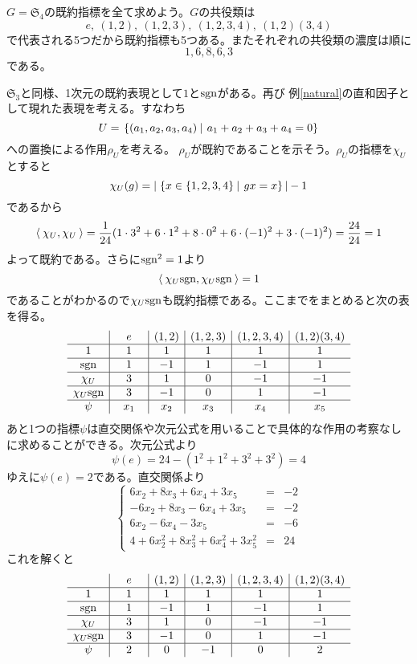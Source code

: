 \documentclass{ltjsarticle}
\begin{document}
\begin{eg}
  $G=\mathfrak{S}_4$の既約指標を全て求めよう。$G$の共役類は
  \[
  e,\:(1,2),\:(1,2,3),\:(1,2,3,4),\:(1,2)(3,4)  
  \]
  で代表される5つだから既約指標も5つある。またそれぞれの共役類の濃度は順に
  \[
  1,6,8,6,3  
  \]
  である。
  
  $\mathfrak{S}_3$と同様、1次元の既約表現として$1$と$\mathrm{sgn}$がある。再び
  例\ref{natural}の直和因子として現れた表現を考える。すなわち
  \[
  U=\left.\left\{(a_1,a_2,a_3,a_4) \: \right| \: a_1+a_2+a_3+a_4=0\right\}  
  \]
  への置換による作用$\rho_U$を考える。
  $\rho_U$が既約であることを示そう。$\rho_U$の指標を$\chi_U$とすると
  \[
  \chi_U(g)=|\left.\left\{x\in\{1,2,3,4\} \: \right| \: gx=x\right\}|-1  
  \]
  であるから
  \[
  \langle\:\chi_U,\chi_U\:\rangle=\frac{1}{24}(1\cdot 3^2+6\cdot 1^2+8\cdot 0^2+6\cdot (-1)^2+3\cdot(-1)^2)=\frac{24}{24}=1 
  \]
  よって既約である。さらに$\mathrm{sgn}^2=1$より
  \[
  \langle\:\chi_U\mathrm{sgn},\chi_U\mathrm{sgn}\:\rangle=1 
  \]
  であることがわかるので$\chi_U\mathrm{sgn}$も既約指標である。ここまでをまとめると次の表を得る。
  \[
    \begin{array}{c|c|c|c|c|c}
  
           & \quad e\quad & (1,2) & (1,2,3) & (1,2,3,4) & (1,2)(3,4)\\
      \hline
      1    & 1 &   1   &    1    &     1     &      1    \\
      \hline
      \mathrm{sgn} & 1 &   -1  &    1    &     -1    &      1   \\
      \hline
      \chi_U & 3 &   1   &    0    &     -1    &      -1  \\
      \hline
      \chi_U\mathrm{sgn} & 3 & -1 &   0    &     1    &     -1  \\
      \hline
      \psi       &  x_1  & x_2 & x_3 &   x_4    &     x_5     
    \end{array}
  \]
  あと1つの指標$\psi$は直交関係や次元公式を用いることで具体的な作用の考察なしに求めることができる。次元公式より
  \[
  \psi(e)=24-(1^2+1^2+3^2+3^2)=4  
  \]
  ゆえに$\psi(e)=2$である。直交関係より
  \[
  \left\{\begin{array}{ccc}
    6x_2+8x_3+6x_4+3x_5 & = & -2\\
    -6x_2+8x_3-6x_4+3x_5 & = & -2\\
    6x_2-6x_4-3x_5 & = & -6\\
    4+6x_2^2+8x_3^2+6x_4^2+3x_5^2 &= &24
  \end{array}\right.  
  \]
  これを解くと
  \[
    \begin{array}{c|c|c|c|c|c}
  
           & \quad e\quad & (1,2) & (1,2,3) & (1,2,3,4) & (1,2)(3,4)\\
      \hline
      1    & 1 &   1   &    1    &     1     &      1    \\
      \hline
      \mathrm{sgn} & 1 &   -1  &    1    &     -1    &      1   \\
      \hline
      \chi_U & 3 &   1   &    0    &     -1    &      -1  \\
      \hline
      \chi_U\mathrm{sgn} & 3 & -1 &   0    &     1    &     -1  \\
      \hline
      \psi       &  2  & 0 & -1 &   0 &     2     
    \end{array}
  \]
\end{eg}
\end{document}
